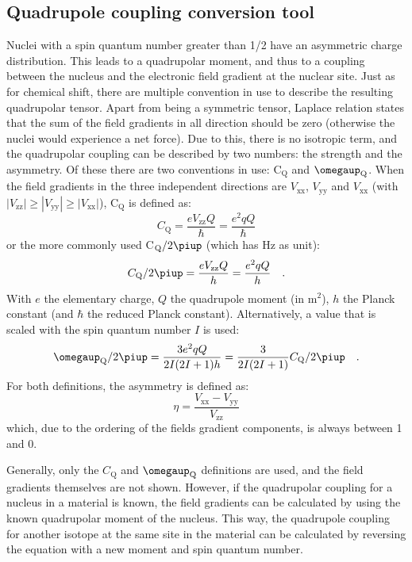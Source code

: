 \documentclass[11pt,a4paper]{article}
\begin{document}
\subsection{Quadrupole coupling conversion tool}
Nuclei with a spin quantum number greater than 1/2 have an asymmetric charge distribution. This leads to a quadrupolar moment, and thus to a coupling between the nucleus and the electronic field gradient at the nuclear site. Just as for chemical shift, there are multiple convention in use to describe the resulting quadrupolar tensor. Apart from being a symmetric tensor, Laplace relation states that the sum of the field gradients in all direction should be zero (otherwise the nuclei would experience a net force). Due to this, there is no isotropic term, and the quadrupolar coupling can be described by two numbers: the strength and the asymmetry. Of these there are two conventions in use: C$_\text{Q}$ and $\omegaup_\text{Q}$. When the field gradients in the three independent directions are $V_\text{xx}$, $V_\text{yy}$ and $V_\text{xx}$ (with $|V_\text{zz}| \geq |V_\text{yy}| \geq |V_\text{xx}|$), C$_\text{Q}$ is defined as:
\begin{equation}
C_\text{Q} = \dfrac{eV_\text{zz}Q}{\hbar} = \dfrac{e^2qQ}{\hbar}
\end{equation}
or the more commonly used C$_\text{Q}/2\piup$ (which has Hz as unit):
\begin{equation}
C_\text{Q}/2\piup = \dfrac{eV_\text{zz}Q}{h} = \dfrac{e^2qQ}{h} \quad .
\end{equation}
With $e$ the elementary charge, $Q$ the quadrupole moment (in m$^2$), $h$ the Planck constant (and $\hbar$ the reduced Planck constant). Alternatively, a value that is scaled with the spin quantum number $I$ is used:
\begin{equation}
\omegaup_\text{Q}/2\piup = \dfrac{3e^2qQ}{2I(2I+1)h} = \dfrac{3}{2I(2I+1)} C_\text{Q}/2\piup	\quad .
\end{equation}
For both definitions, the asymmetry is defined as:
\begin{equation}
\eta = \dfrac{V_\text{xx} -V_\text{yy}}{V_\text{zz}}
\end{equation}
which, due to the ordering of the fields gradient components, is always between 1 and 0.

Generally, only the $C_\text{Q}$ and $\omegaup_\text{Q}$ definitions are used, and the field gradients themselves are not shown. However, if the quadrupolar coupling for a nucleus in a material is known, the field gradients can be calculated by using the known quadrupolar moment of the nucleus. This way, the quadrupole coupling for another isotope at the same site in the material can be calculated by reversing the equation with a new moment and spin quantum number.
\end{document}
